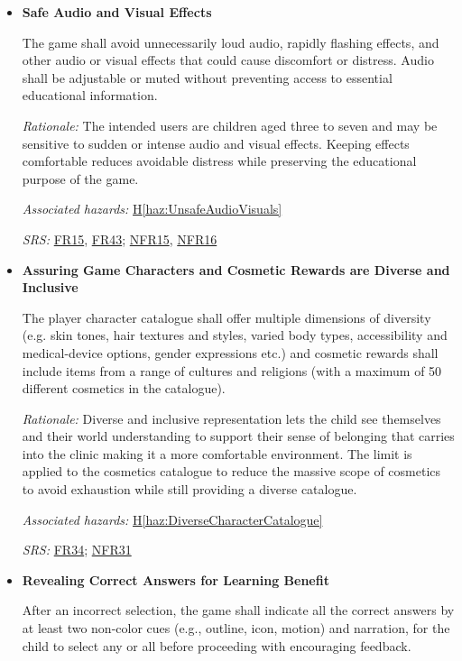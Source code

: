 \documentclass{article}
\newcounter{hazard}
\newcommand{\hazref}[1]{\hyperref[haz:#1]{H\ref*{haz:#1}}}
\newcounter{sr}
\newcommand{\srdef}[1]{\refstepcounter{sr}\label{sr:#1}\textbf{SR-\thesr:}}
\newcommand{\srsurl}{https://team-hindsight.github.io/ophthamology-game/SRS/SRS.pdf}
\newcommand{\srsfrref}[2]{\href{\srsurl\#nameddest=#1}{FR#2}}
\newcommand{\srsnfrref}[2]{\href{\srsurl\#nameddest=#1}{NFR#2}}
\begin{document}
\begin{itemize}[leftmargin=1.5cm, labelwidth=1.3cm, labelsep=0.2cm,
  align=left, itemsep=1.2em, parsep=0.6em]
\item[\srdef{SafeAudioVisuals}]
\textbf{Safe Audio and Visual Effects}

The game shall avoid unnecessarily loud audio,
rapidly flashing effects, and other audio or visual
effects that could cause discomfort or distress.
Audio shall be adjustable or muted without
preventing access to essential educational
information.

\textit{Rationale:}
The intended users are children aged three to
seven and may be sensitive to sudden or intense
audio and visual effects. Keeping effects
comfortable reduces avoidable distress while
preserving the educational purpose of the game.

\textit{Associated hazards:}
\hazref{UnsafeAudioVisuals}

\textit{SRS:} \srsfrref{FR_NarrationFallback}{15}, \srsfrref{FR_Preferences}{43}; \srsnfrref{NFR_AudioSafety}{15}, \srsnfrref{NFR_Flashing}{16}

\item[\srdef{CharacterDiversityInclusivity}]
\textbf{Assuring Game Characters and Cosmetic Rewards are Diverse and Inclusive}

The player character catalogue shall offer multiple dimensions of 
diversity (e.g. skin tones, hair textures and styles, varied body types, 
accessibility and medical-device options, gender expressions etc.) and 
cosmetic rewards shall include items from a range of cultures and religions 
(with a maximum of 50 different cosmetics in the catalogue).

\textit{Rationale:}
Diverse and inclusive representation lets the child see themselves and their 
world understanding to support their sense of belonging that carries into the 
clinic making it a more comfortable environment. The limit is applied to the 
cosmetics catalogue to reduce the massive scope of cosmetics to avoid 
exhaustion while still providing a diverse catalogue.

\textit{Associated hazards:}
\hazref{DiverseCharacterCatalogue}

\textit{SRS:} \srsfrref{FR_DiverseCharacters}{34}; \srsnfrref{NFR_Inclusivity}{31}

\item[\srdef{CorrectAnswerReveal}]
\textbf{Revealing Correct Answers for Learning Benefit}

After an incorrect selection, the game shall indicate all the correct answers 
by at least two non-color cues (e.g., outline, icon, motion) and narration, for 
the child to select any or all before proceeding with encouraging feedback.


\end{itemize}
\end{document}
